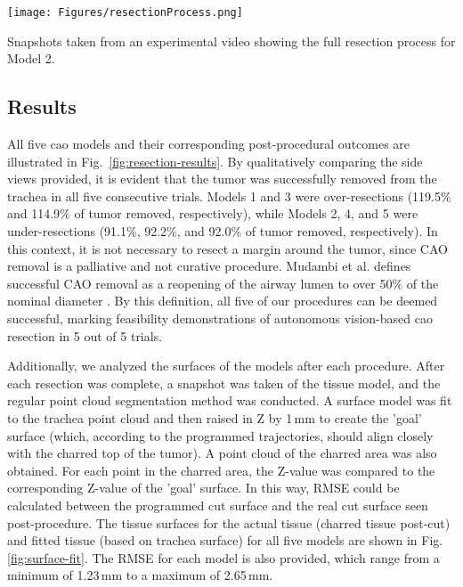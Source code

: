 \vspace{1em}
\begin{figurehere}
    \centering
    \texttt{[image: Figures/resectionProcess.png]}
    \caption{Snapshots taken from an experimental video showing the full resection process for Model 2.}
    \label{fig:resection-process}
\end{figurehere}
\vspace{1em}




\subsection{Results}

All five \gls{cao} models and their corresponding post-procedural outcomes are illustrated in Fig.~\ref{fig:resection-results}. By qualitatively comparing the side views provided, it is evident that the tumor was successfully removed from the trachea in all five consecutive trials. Models 1 and 3 were over-resections (119.5\% and 114.9\% of tumor removed, respectively), while Models 2, 4, and 5 were under-resections (91.1\%, 92.2\%, and 92.0\% of tumor removed, respectively). In this context, it is not necessary to resect a margin around the tumor, since CAO removal is a palliative and not curative procedure. Mudambi et al. defines successful CAO removal as a reopening of the airway lumen to over 50\% of the nominal diameter \cite{Mudambi2017}. By this definition, all five of our procedures can be deemed successful, marking feasibility demonstrations of autonomous vision-based \gls{cao} resection in 5 out of 5 trials.


Additionally, we analyzed the surfaces of the models after each procedure. After each resection was complete, a snapshot was taken of the tissue model, and the regular point cloud segmentation method was conducted. A surface model was fit to the trachea point cloud and then raised in Z by 1\,mm to create the 'goal' surface (which, according to the programmed trajectories, should align closely with the charred top of the tumor). A point cloud of the charred area was also obtained. For each point in the charred area, the Z-value was compared to the corresponding Z-value of the 'goal' surface. In this way, RMSE could be calculated between the programmed cut surface and the real cut surface seen post-procedure. The tissue surfaces for the actual tissue (charred tissue post-cut) and fitted tissue (based on trachea surface) for all five models are shown in Fig. \ref{fig:surface-fit}. The RMSE for each model is also provided, which range from a minimum of 1.23\,mm to a maximum of 2.65\,mm. 


